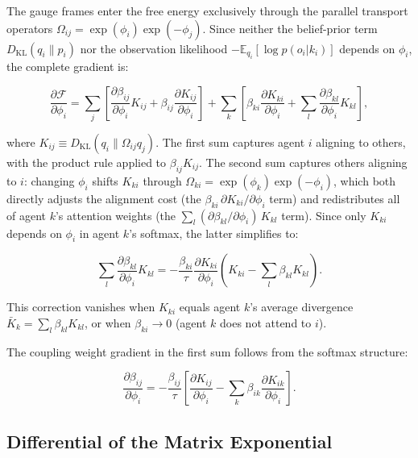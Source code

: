 \documentclass[twoside,11pt]{article}
\begin{document}
The gauge frames enter the free energy exclusively through the parallel transport operators $\Omega_{ij} = \exp(\phi_i)\exp(-\phi_j)$. Since neither the belief-prior term $D_{\mathrm{KL}}(q_i \| p_i)$ nor the observation likelihood $-\mathbb{E}_{q_i}[\log p(o_i | k_i)]$ depends on $\phi_i$, the complete gradient is:

\begin{equation}
\frac{\partial \mathcal{F}}{\partial \phi_i}
= \sum_j \left[
\frac{\partial \beta_{ij}}{\partial \phi_i} K_{ij}
+ \beta_{ij} \frac{\partial K_{ij}}{\partial \phi_i}
\right]
+ \sum_k \left[
\beta_{ki} \frac{\partial K_{ki}}{\partial \phi_i}
+ \sum_l \frac{\partial \beta_{kl}}{\partial \phi_i} K_{kl}
\right],
\label{eq:phi_grad_complete}
\end{equation}

where $K_{ij} \equiv D_{\mathrm{KL}}(q_i \| \Omega_{ij} q_j)$. The first sum captures agent $i$ aligning to others, with the product rule applied to $\beta_{ij} K_{ij}$. The second sum captures others aligning to $i$: changing $\phi_i$ shifts $K_{ki}$ through $\Omega_{ki} = \exp(\phi_k)\exp(-\phi_i)$, which both directly adjusts the alignment cost (the $\beta_{ki}\,\partial K_{ki}/\partial \phi_i$ term) and redistributes all of agent $k$'s attention weights (the $\sum_l (\partial \beta_{kl}/\partial \phi_i)\, K_{kl}$ term). Since only $K_{ki}$ depends on $\phi_i$ in agent $k$'s softmax, the latter simplifies to:

\begin{equation}
\sum_l \frac{\partial \beta_{kl}}{\partial \phi_i} K_{kl}
= -\frac{\beta_{ki}}{\tau}\frac{\partial K_{ki}}{\partial \phi_i}
\left(K_{ki} - \sum_l \beta_{kl} K_{kl}\right).
\label{eq:reverse_beta_grad_phi}
\end{equation}

This correction vanishes when $K_{ki}$ equals agent $k$'s average divergence $\bar{K}_k = \sum_l \beta_{kl} K_{kl}$, or when $\beta_{ki} \to 0$ (agent $k$ does not attend to $i$).

The coupling weight gradient in the first sum follows from the softmax structure:

\begin{equation}
\frac{\partial \beta_{ij}}{\partial \phi_i} = -\frac{\beta_{ij}}{\tau}\left[
\frac{\partial K_{ij}}{\partial \phi_i} - \sum_k \beta_{ik} \frac{\partial K_{ik}}{\partial \phi_i}
\right].
\label{eq:beta_grad_phi}
\end{equation}

\subsection{Differential of the Matrix Exponential}
\end{document}
